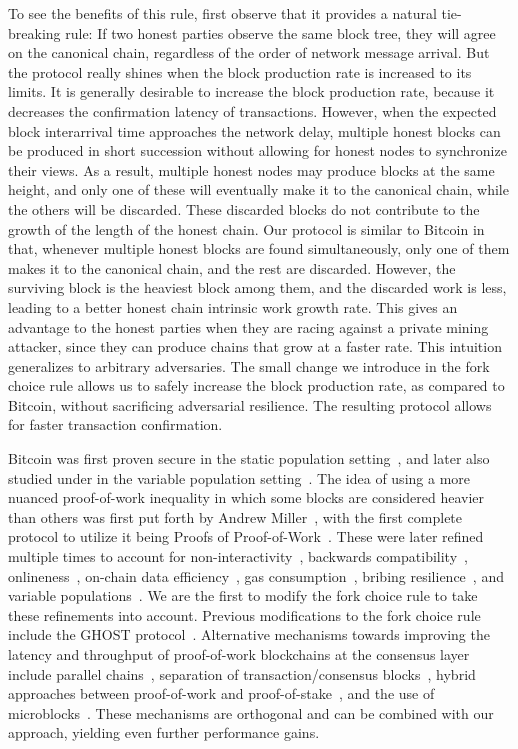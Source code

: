 To see the benefits of this rule, first observe that it provides a natural tie-breaking rule:
If two honest parties observe the same block tree, they will agree on
the canonical chain, regardless of the order of network message arrival. But the protocol
really shines when the block production rate is increased to its limits. It is generally desirable
to increase the block production rate, because it decreases the confirmation latency of transactions.
However, when the expected block interarrival time approaches the network delay, multiple honest blocks
can be produced in short succession without allowing for honest nodes to synchronize their views.
As a result, multiple honest nodes may produce blocks at the same height, and only one of these will
eventually make it to the canonical chain, while the others will be discarded. These discarded blocks
do not contribute to the growth of the length of the honest chain. Our protocol is similar to Bitcoin in that,
whenever multiple honest blocks are found simultaneously, only one of them makes it to the canonical chain,
and the rest are discarded. However, the surviving block is the heaviest block among them, and the discarded
work is less, leading to a better honest chain intrinsic work growth rate. This gives an advantage to the honest
parties when they are racing against a private mining attacker, since they can produce chains that grow
at a faster rate. This intuition generalizes to arbitrary adversaries.
The small change we introduce in the fork choice rule allows us to safely increase the block production
rate, as compared to Bitcoin, without sacrificing adversarial resilience. The resulting protocol
allows for faster transaction confirmation.

\noindent
{}
Bitcoin was first proven secure in the static population setting~\cite{backbone},
and later also studied under in the variable population setting~\cite{varbackbone}.
The idea of using a more nuanced proof-of-work inequality in which some blocks
are considered heavier than others was first put forth by Andrew Miller~\cite{highway},
with the first complete protocol to utilize it being
Proofs of Proof-of-Work~\cite{popow}. These were later refined multiple times
to account for non-interactivity~\cite{nipopows}, backwards compatibility~\cite{velvet-nipopows},
onlineness~\cite{logspace}, on-chain data efficiency~\cite{compact-superblocks},
gas consumption~\cite{gasefficient-nipopows},
bribing resilience~\cite{soft-power},
and variable populations~\cite{dionyziz}.
We are the first to modify the fork choice rule to take these refinements into
account. Previous modifications to the fork choice rule include the GHOST
protocol~\cite{ghost}.
Alternative mechanisms towards improving the latency and throughput
of proof-of-work blockchains at the consensus
layer include parallel chains~\cite{parallel-chains},
separation of transaction/consensus blocks~\cite{prism},
hybrid approaches between proof-of-work and proof-of-stake~\cite{byzcoin},
and the use of microblocks~\cite{bitcoin-ng}. These mechanisms
are orthogonal and can be combined with our approach, yielding even
further performance gains.

